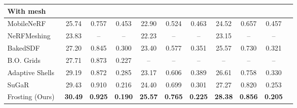 \begin{table}
{\begin{tabular}{@{}lcccccccccc@{}}
    \midrule
    \multicolumn{10}{l}{\textbf{With mesh}} \\
    \midrule
    MobileNeRF~\cite{chen2022mobilenerf} & 25.74 & 0.757 & 0.453 & 22.90 & 0.524 & 0.463 & 24.52 & 0.657 & 0.457 \\
    NeRFMeshing~\cite{rakotosaona2023nerfmeshing} & 23.83 & -- & -- & 22.23 & -- & -- & 23.15 & -- & -- \\
    BakedSDF~\cite{yariv-2023-bakedsdf} & 27.20 & 0.845 & 0.300 & \cellcolor{yellow!25}23.40 & 0.577 & \cellcolor{yellow!25}0.351 & 25.57 & 0.730 & \cellcolor{yellow!25}0.321 \\
    B.O. Grids~\cite{reiser2024binaryopacitygrid} & 27.71 & \cellcolor{yellow!25}0.873 & \cellcolor{yellow!25}0.227 & -- & -- & -- & -- & -- & -- \\
    Adaptive Shells~\cite{wang-siggraphasia2023-adaptive-shells} & \cellcolor{yellow!25}29.19 & 0.872 & 0.285 & 23.17  & \cellcolor{yellow!25}0.606 & 0.389 & \cellcolor{yellow!25}26.61 & \cellcolor{yellow!25}0.758 & 0.330 \\
    SuGaR\cite{guedon2023sugar} & \cellcolor{orange!25}29.43 & \cellcolor{orange!25}0.910 & \cellcolor{orange!25}0.216 & \cellcolor{orange!25}24.40 & \cellcolor{orange!25}0.699 & \cellcolor{orange!25}0.301 & \cellcolor{orange!25}27.27 & \cellcolor{orange!25}0.820 & \cellcolor{orange!25}0.253 \\
    Frosting (Ours) & \cellcolor{red!25}\textbf{30.49} & \cellcolor{red!25}\textbf{0.925} & \cellcolor{red!25}\textbf{0.190} & \cellcolor{red!25}\textbf{25.57} & \cellcolor{red!25}\textbf{0.765} & \cellcolor{red!25}\textbf{0.225} & \cellcolor{red!25}\textbf{28.38} & \cellcolor{red!25}\textbf{0.856} & \cellcolor{red!25}\textbf{0.205}\\
    \bottomrule
  \end{tabular}
  }
\end{table}